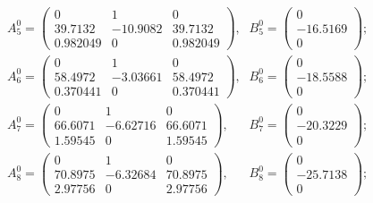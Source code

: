 \begin{equation*}
\begin{array}{lr}
A_5^0 = \left(\begin{array}{ccc}
0    &    1    &    0 \\
39.7132    &    -10.9082    &    39.7132 \\
0.982049    &    0    &    0.982049
\end{array}\right)\mbox{,} &
B_5^0 = \left(\begin{array}{c}
0 \\
-16.5169 \\
0
\end{array}\right)\mbox{;} \\

A_6^0 = \left(\begin{array}{ccc}
0    &    1    &    0 \\
58.4972    &    -3.03661    &    58.4972 \\
0.370441    &    0    &    0.370441
\end{array}\right)\mbox{,} &
B_6^0 = \left(\begin{array}{c}
0 \\
-18.5588 \\
0
\end{array}\right)\mbox{;} \\

A_7^0 = \left(\begin{array}{ccc}
0    &    1    &    0 \\
66.6071    &    -6.62716    &    66.6071 \\
1.59545    &    0    &    1.59545
\end{array}\right)\mbox{,} &
B_7^0 = \left(\begin{array}{c}
0 \\
-20.3229 \\
0
\end{array}\right)\mbox{;} \\

A_8^0 = \left(\begin{array}{ccc}
0    &    1    &    0 \\
70.8975    &    -6.32684    &    70.8975 \\
2.97756    &    0    &    2.97756
\end{array}\right)\mbox{,} &
B_8^0 = \left(\begin{array}{c}
0 \\
-25.7138 \\
0
\end{array}\right)\mbox{;} \\


\end{array}
\end{equation*}
